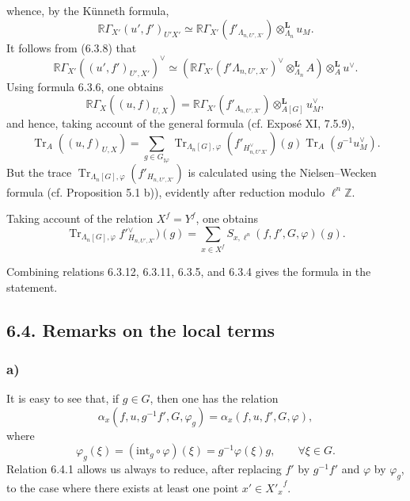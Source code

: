 \documentclass[11pt]{article}
\providecommand{\Tr}{\operatorname{Tr}}
\providecommand{\Tr}{\operatorname{Tr}}
\providecommand{\Tr}{\operatorname{Tr}}
\providecommand{\Tr}{\operatorname{Tr}}
\providecommand{\La}{\Lambda}
\providecommand{\Tr}{\operatorname{Tr}}
\begin{document}
whence, by the Künneth formula,
\begin{equation}
\tag{6.3.8}
\mathbb{R}\Gamma_{X'}(u',f')_{U'X'}\simeq
\mathbb{R}\Gamma_{X'}(f'_{\La_{n,U',X'}})\otimes_{\La_n}^{\mathbf L}u_M.
\end{equation}
It follows from (6.3.8) that
\begin{equation}
\tag{6.3.9}
\mathbb{R}\Gamma_{X'}((u',f')_{U',X'})^\vee\simeq
(\mathbb{R}\Gamma_{X'}(f'{\La_{n,U',X'}})^\vee\otimes_{\La_n}^{\mathbf L}A)\otimes_A^{\mathbf L}u^\vee.
\end{equation}
Using formula 6.3.6, one obtains
\begin{equation}
\tag{6.3.10}
\mathbb{R}\Gamma_X((u,f)_{U,X})=\mathbb{R}\Gamma_{X'}(f'_{\La_{n,U',X'}})\otimes_{A[G]}^{\mathbf L}u_M^\vee,
\end{equation}
and hence, taking account of the general formula (cf. Exposé XI, 7.5.9),
\begin{equation}
\tag{6.3.11}
\Tr_A((u,f)_{U,X})=
\sum_{g\in G_{\natural\varphi}}\Tr_{\La_n[G],\varphi}(f'_{H^\vee_{n,U'X'}})(g)\Tr_A(g^{-1}u_M^\vee).
\end{equation}
But the trace $\Tr_{\La_n[G],\varphi}(f'{}_{H_{n,U',X'}})$ is calculated using the Nielsen--Wecken formula (cf. Proposition 5.1 b)), evidently after reduction modulo $\ell^n\mathbb Z$.

Taking account of the relation $X^f=Y^f$, one obtains
\begin{equation}\tag{6.3.12}
\Tr_{\La_n[G],\varphi}f'{}^\vee_{H_{n,U',X'}})(g)=\sum_{x\in X^f}S_{x,\ell^n}(f,f',G,\varphi)(g).
\end{equation}

Combining relations 6.3.12, 6.3.11, 6.3.5, and 6.3.4 gives the formula in the statement.

\subsection*{6.4. Remarks on the local terms}
\subsubsection*{a)} It is easy to see that, if $g\in G$, then one has the relation
\begin{equation}\tag{6.4.1}
\alpha_x(f,u,g^{-1}f',G,\varphi_g)
=
\alpha_x(f,u,f',G,\varphi),
\end{equation}
where
\begin{equation}\tag{6.4.2}
\varphi_g(\xi)=(\mathrm{int}_g\circ\varphi)(\xi)=g^{-1}\varphi(\xi)g,
\qquad \forall\xi\in G.
\end{equation}
Relation 6.4.1 allows us always to reduce, after replacing $f'$ by $g^{-1}f'$ and $\varphi$ by $\varphi_g$, to the case where there exists at least one point $x'\in {X'_x}^{f}$.
\end{document}
